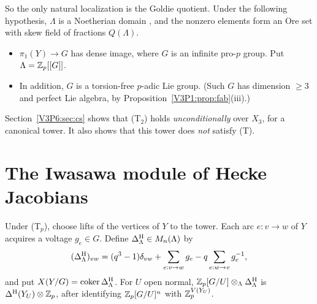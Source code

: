So the only natural localization is the Goldie quotient. Under the following hypothesis,
$\Lambda$ is a Noetherian domain \cite{Laz65,Neu88}, and the nonzero elements form an Ore set
with skew field of fractions $Q(\Lambda)$.

\begin{itemize}
\item[(T$_p$)] $\pi_1(Y)\to G$ has dense image, where $G$ is an infinite pro-$p$ group. Put
$\Lambda=\mathbb{Z}_p[[G]]$.
\item[(T)] In addition, $G$ is a torsion-free $p$-adic Lie group. (Such $G$ has dimension $\ge3$
and perfect Lie algebra, by Proposition~\ref{V3P1:prop:fab}(iii).)
\end{itemize}
Section~\ref{V3P6:sec:cs} shows that (T$_2$) holds \emph{unconditionally} over $X_3$, for a
canonical tower. It also shows that this tower does \emph{not} satisfy (T).

\section{The Iwasawa module of Hecke Jacobians}\label{V3P6:sec:main}

Under (T$_p$), choose lifts of the vertices of $Y$ to the tower. Each arc $e\colon v\to w$ of $Y$
acquires a voltage $g_e\in G$. Define $\Delta^{\mathrm{H}}_\Lambda\in M_n(\Lambda)$ by
\[
(\Delta^{\mathrm{H}}_\Lambda)_{vw}=(q^{3}-1)\delta_{vw}+\sum_{e:v\to w}g_e-q\sum_{e:w\to v}g_e^{-1},
\]
and put $X(Y/G)=\operatorname{coker}\Delta^{\mathrm{H}}_\Lambda$. For $U$ open normal, $\mathbb{Z}_p[G/U]\otimes_\Lambda\Delta^{\mathrm{H}}_\Lambda$
is $\Delta^{\mathrm{H}}(Y_U)\otimes\mathbb{Z}_p$, after identifying $\mathbb{Z}_p[G/U]^{n}$ with $\mathbb{Z}_p^{V(Y_U)}$.

